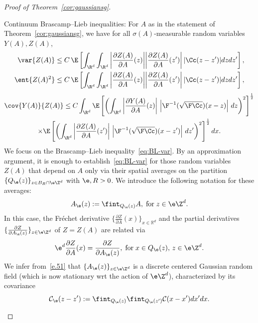 \begin{proof}[Proof of Theorem~\ref{cor:gaussiansg}]

\begin{step}{Continuum Brascamp--Lieb inequalities:}\label{step1prooftheo3.2}
For $A$ as in the statement of Theorem~\ref{cor:gaussiansg}, we have for all $\sigma(A)$-measurable random variables $Y(A),Z(A)$,
\begin{align}
\var {Z(A)}&\le C\,\E\left[\int_{\R^d}\int_{\R^d}\left|\frac{\partial Z(A)}{\partial A}(z)\bigg|\bigg|\frac{\partial Z(A)}{\partial A}(z')\right| |\Cc(z-z')|dzdz'\right],\label{eq:BL-var}
\\
\ent{Z(A)^2}&\le C\,\E\left[\int_{\R^d}\int_{\R^d}\left|\frac{\partial Z(A)}{\partial A}(z)\bigg|\bigg|\frac{\partial Z(A)}{\partial A}(z')\right| |\Cc(z-z')|dzdz'\right],\label{B3}
\end{align}
\begin{multline*}
\cov {Y(A)}{Z(A)}\le C\int_{\R^d}\E\left[\left(\int_{\R^d}\left|\frac{\partial Y(A)}{\partial A}(z)\right|\,\left|\F^{-1}(\sqrt{\F\Cc})(x-z)\right|\,dz\right)^2\right]^\frac12\\
\times\E\left[\left(\int_{\R^d}\left|\frac{\partial Z(A)}{\partial A}(z')\right|\,\left|\F^{-1}(\sqrt{\F\Cc})(x-z')\right|\,dz'\right)^2\right]^\frac12 dx.
\end{multline*}
We focus on the Brascamp--Lieb inequality~\eqref{eq:BL-var}. By an approximation argument, it is enough to establish~\eqref{eq:BL-var} for those random variables $Z(A)$ that depend on $A$ only via their spatial averages on the partition $\{Q_\e(z)\}_{z\in B_R\cap\e\Z^d}$ with $\e,R>0$. We introduce the following notation for these averages:
\begin{equation}\label{e.51}
A_\e(z):=\fint_{Q_\e(z)}A,\;\text{for}\;z\in\e\Z^d.
\end{equation}
In this case, the Fréchet derivative $\{\frac{\partial Z}{\partial A}(x)\}_{x\in\mathbb{R}^d}$ and the partial derivatives\linebreak$\{\frac{\partial Z}{\partial A_\e(z)}\}_{z\in\e\Z^d}$ of $Z=Z(A)$ are related via
\begin{equation}\label{e.54}
\e^d\frac{\partial Z}{\partial A}(x)=\frac{\partial Z}{\partial A_\e(z)},\;
\text{for}\;x\in Q_\e(z),\,z\in \e\Z^d.
\end{equation}
We infer from~\eqref{e.51} that $\{A_\e(z)\}_{z\in\e\Z^d}$ is a discrete centered Gaussian random field (which is now stationary wrt the action of $\e\Z^d$), characterized by its covariance
\begin{equation}\label{e.52}
\mathcal C_\e(z-z'):=\fint_{Q_\e(z)}\fint_{Q_\e(z')}\mathcal C(x-x')dx' dx.

\end{equation}
\end{step}
\end{proof}

